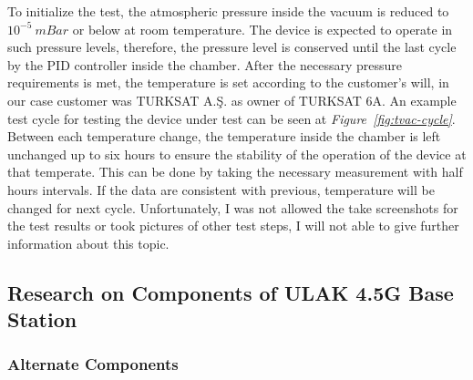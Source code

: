 	 To initialize the test, the atmospheric pressure inside the vacuum is reduced to $10^{-5}~mBar$ or below at room temperature. The device is expected to operate in such pressure levels, therefore, the pressure level is conserved until the last cycle by the PID controller inside the chamber. After the necessary pressure requirements is met, the temperature is set according to the customer's will, in our case customer was TURKSAT A.Ş. as owner of TURKSAT 6A. An example test cycle for testing the device under test can be seen at \textit{Figure~\ref{fig:tvac-cycle}}. Between each temperature change, the temperature inside the chamber is left unchanged up to six hours to ensure the stability of the operation of the device at that temperate. This can be done by taking the necessary measurement with half hours intervals. If the data are consistent with previous, temperature will be changed for next cycle. Unfortunately, I was not allowed the take screenshots for the test results or took pictures of other test steps,  I will not able to give further information about this topic.
		

\subsection{Research on Components of ULAK 4.5G Base Station  }

\subsubsection{Alternate Components}

\- \vfill

								
	
 
%      
	

